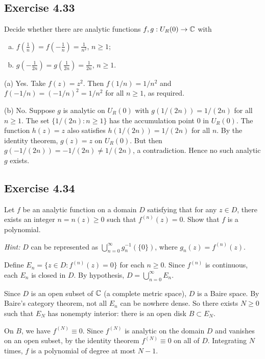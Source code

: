 \documentclass{article}
\begin{document}
\subsection{Exercise 4.33}

Decide whether there are analytic functions
$f, g : U_R(0) \to \mathbb{C}$ with
\begin{enumerate}[(a)]
  \item $f(\tfrac{1}{n}) = f(-\tfrac{1}{n}) = \tfrac{1}{n^2}$,
    $n \ge 1$;
  \item $g(-\tfrac{1}{2n}) = g(\tfrac{1}{2n}) = \tfrac{1}{2n}$,
    $n \ge 1$.
\end{enumerate}

\begin{solution}
  (a) Yes. Take $f(z) = z^2$. Then
  $f(1/n) = 1/n^2$ and $f(-1/n) = (-1/n)^2 = 1/n^2$
  for all $n \ge 1$, as required.

  \medskip
  (b) No. Suppose $g$ is analytic on $U_R(0)$ with
  $g(1/(2n)) = 1/(2n)$ for all $n \ge 1$.
  The set $\{1/(2n) : n \ge 1\}$ has the accumulation point $0$
  in $U_R(0)$. The function $h(z) = z$ also satisfies
  $h(1/(2n)) = 1/(2n)$ for all $n$.
  By the identity theorem, $g(z) = z$ on $U_R(0)$.
  But then $g(-1/(2n)) = -1/(2n) \ne 1/(2n)$, a contradiction.
  Hence no such analytic $g$ exists.
\end{solution}

\subsection{Exercise 4.34}

Let $f$ be an analytic function on a domain $D$ satisfying that for
any $z \in D$, there exists an integer $n = n(z) \ge 0$ such that
$f^{(n)}(z) = 0$.  Show that $f$ is a polynomial.

\textit{Hint:} $D$ can be represented as
$\bigcup_{n=0}^{\infty} g_n^{-1}(\{0\})$,
where $g_n(z) = f^{(n)}(z)$.

\begin{solution}
  Define $E_n = \{z \in D : f^{(n)}(z) = 0\}$ for each $n \ge 0$.
  Since $f^{(n)}$ is continuous, each $E_n$ is closed in $D$.
  By hypothesis, $D = \bigcup_{n=0}^{\infty} E_n$.

  Since $D$ is an open subset of $\mathbb{C}$ (a complete metric space),
  $D$ is a Baire space. By Baire's category theorem, not all $E_n$
  can be nowhere dense. So there exists $N \ge 0$ such that $E_N$
  has nonempty interior: there is an open disk $B \subset E_N$.

  On $B$, we have $f^{(N)} \equiv 0$. Since $f^{(N)}$ is analytic
  on the domain $D$ and vanishes on an open subset, by the identity
  theorem $f^{(N)} \equiv 0$ on all of $D$.
  Integrating $N$ times, $f$ is a polynomial of degree at most $N - 1$.
\end{solution}
\end{document}
